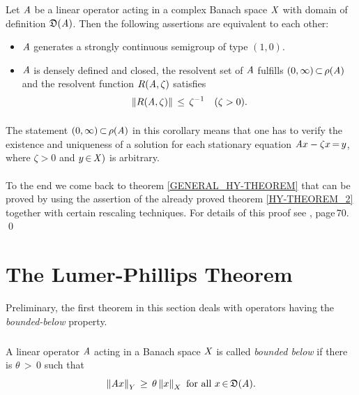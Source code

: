 \documentclass[11pt,twoside]{article}
\begin{document}
\begin{corollary}\label{HY-THEOREM_3}
Let $\mathit{A}$ be a linear operator acting in a complex Banach space $\mathit{X}$
with domain of definition $\mathfrak{D}(\mathit{A})$.
Then the following assertions are equivalent to each other:

\begin{itemize}[leftmargin=15pt]
\item[(a)]
$\mathit{A}$ generates a strongly continuous semigroup of type $(1,0)$.

\item[(b)]
$\mathit{A}$ is densely defined and closed,
the resolvent set of $\mathit{A}$ fulfills $(0,\infty) {\,\subset\,} \rho(\mathit{A})$
and the resolvent function $R(\mathit{A},\zeta)$ satisfies
\[
\left\lVert R(\mathit{A},\zeta) \right\rVert
\, \leq \, \zeta^{-1} \quad (\zeta > 0).
\]
\end{itemize}
\end{corollary}

\paragraph{}
The statement $(0,\infty) {\,\subset\,} \rho(\mathit{A})$ in this corollary means that
one has to verify the existence and uniqueness of a solution
for each stationary equation $\mathit{A} x - \zeta x {\,=\,} y$,
where $\zeta > 0$ and $y {\,\in\,} \mathit{X})$ is arbitrary.

\paragraph{}
To the end we come back to theorem \ref{GENERAL_HY-THEOREM}
that can be proved
by using the assertion of the already proved theorem \ref{HY-THEOREM_2}
together with certain rescaling techniques.
For details of this proof see \cite{EN}, page\,70.
\qed

\section{The Lumer-Phillips Theorem}
Preliminary,
the first theorem in this section deals with operators
having the \textit{bounded-below} property.

\subparagraph{} %
A linear operator $\mathit{A}$ acting in a Banach space $\mathit{X}$
is called \textit{bounded below}
if there is $\theta {\,>\,} 0$ such that
\begin{equation}\label{BOUNDED_BELOW_PROPERTY}
\left\lVert \mathit{A} x \right\rVert_Y \, \geq \, \theta \left\lVert x \right\rVert_X \mbox{ for all } x {\,\in\,} \mathfrak{D}(\mathit{A}).
\end{equation}
\end{document}
